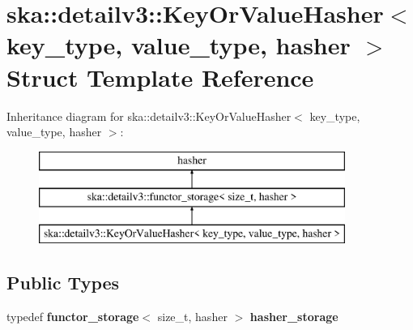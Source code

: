 \section{ska\+:\+:detailv3\+:\+:Key\+Or\+Value\+Hasher$<$ key\+\_\+type, value\+\_\+type, hasher $>$ Struct Template Reference}
\label{structska_1_1detailv3_1_1KeyOrValueHasher}
Inheritance diagram for ska\+:\+:detailv3\+:\+:Key\+Or\+Value\+Hasher$<$ key\+\_\+type, value\+\_\+type, hasher $>$\+:\begin{figure}[H]
\begin{center}
\leavevmode
\includegraphics[height=3.000000cm]{structska_1_1detailv3_1_1KeyOrValueHasher}
\end{center}
\end{figure}
\subsection*{Public Types}
\begin{DoxyCompactItemize}
\item 
typedef {\bf functor\+\_\+storage}$<$ size\+\_\+t, hasher $>$ {\bfseries hasher\+\_\+storage}\label{structska_1_1detailv3_1_1KeyOrValueHasher_a1209a00d8459b8b5b476e66639738493}

\end{DoxyCompactItemize}
